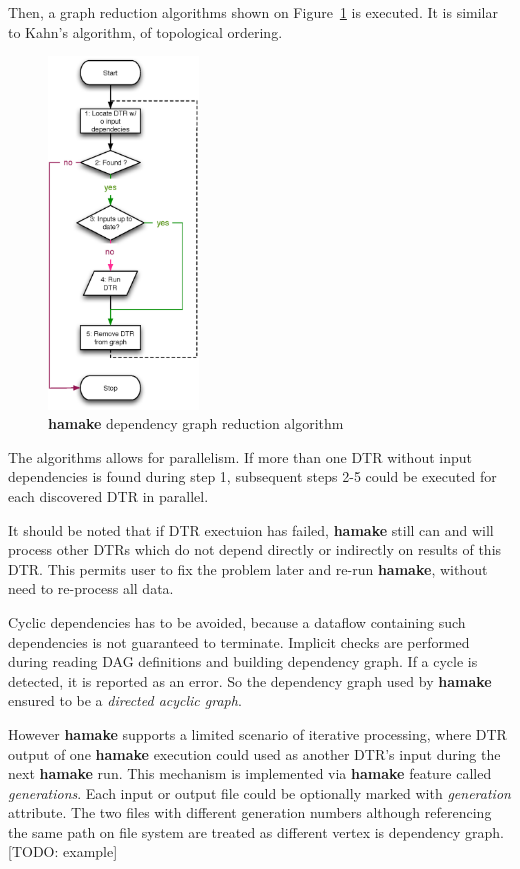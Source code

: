 \documentclass[10pt,conference,letterpaper]{IEEEtran}
\begin{document}
Then, a graph reduction algorithms shown on Figure~\ref{fig:grred} is
executed. It is similar to Kahn's algorithm\cite{kahn1962topological},
of topological ordering.

\begin{figure}[htp]
\centering
\includegraphics[width=4cm]{GraphReduction.eps}
\caption{\textbf{hamake} dependency graph reduction algorithm}
\label{fig:grred}
\end{figure}

The algorithms allows for parallelism. If more than one DTR without
input dependencies is found during step 1, subsequent steps 2-5 could
be executed for each discovered DTR in parallel.

It should be noted that if DTR exectuion has failed, \textbf{hamake} still can
and will process other DTRs which do not depend directly or indirectly
on results of this DTR. This permits user to fix the problem later and
re-run \textbf{hamake}, without need to re-process all data.

Cyclic dependencies has to be avoided, because a dataflow containing
such dependencies is not guaranteed to terminate. Implicit checks are
performed during reading DAG definitions and building dependency
graph. If a cycle is detected, it is reported as an error. So the
dependency graph used by \textbf{hamake} ensured to be a
\textit{directed acyclic graph}.

However \textbf{hamake} supports a limited scenario of iterative
processing, where DTR output of one \textbf{hamake} execution could used as
another DTR's input during the next \textbf{hamake} run. This mechanism is
implemented via \textbf{hamake} feature called
\textit{generations}. Each input or output file could be optionally
marked with \emph{generation} attribute. The two files with different
generation numbers although referencing the same path on file system
are treated as different vertex is dependency graph. [TODO: example]
\end{document}
